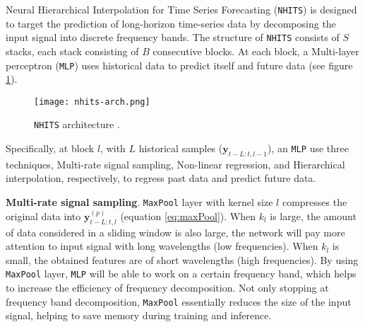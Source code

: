 Neural Hierarchical Interpolation for Time Series Forecasting (\verb|NHITS|) \cite{challu2023nhits} is designed to target the prediction of long-horizon time-series data by decomposing the input signal into discrete frequency bands. The structure of \verb|NHITS| consists of $S$ stacks, each stack consisting of $B$ consecutive blocks. At each block, a Multi-layer perceptron (\verb|MLP|) uses historical data to predict itself and future data (see figure \ref{fig:nhits}).

\begin{figure}[H]
    \centering
    \texttt{[image: nhits-arch.png]}
    \cprotect\caption{\verb|NHITS| architecture \cite{challu2023nhits}.}
    \label{fig:nhits}
\end{figure}


Specifically, at block $l$, with $L$ historical samples ($\mathbf{y}_{t-L:t, l-1}$), an \verb|MLP| use three techniques, Multi-rate signal sampling, Non-linear regression, and Hierarchical interpolation, respectively, to regress past data and predict future data.


\textbf{Multi-rate signal sampling}. \verb|MaxPool| layer with kernel size $l$ compresses the original data into $\mathbf{y}_{t-L:t, l}^{(p)}$ (equation \ref{eq:maxPool}). When $k_l$ is large, the amount of data considered in a sliding window is also large, the network will pay more attention to input signal with long wavelengths (low frequencies). When $k_l$ is small, the obtained features are of short wavelengths (high frequencies). By using \verb|MaxPool| layer, \verb|MLP| will be able to work on a certain frequency band, which helps to increase the efficiency of frequency decomposition. Not only stopping at frequency band decomposition, \verb|MaxPool| essentially reduces the size of the input signal, helping to save memory during training and inference.

